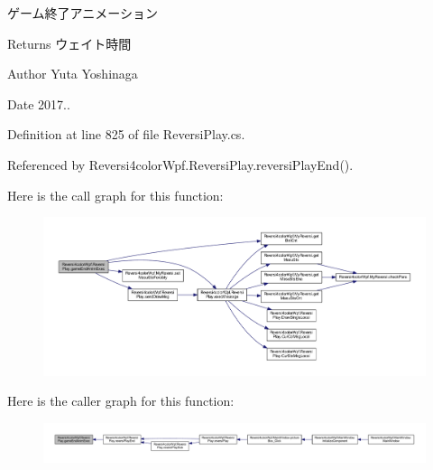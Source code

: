 ゲーム終了アニメーション 

\begin{DoxyReturn}{Returns}
ウェイト時間 
\end{DoxyReturn}
\begin{DoxyAuthor}{Author}
Yuta Yoshinaga 
\end{DoxyAuthor}
\begin{DoxyDate}{Date}
2017.. 
\end{DoxyDate}


Definition at line 825 of file Reversi\+Play.\+cs.



Referenced by Reversi4color\+Wpf.\+Reversi\+Play.\+reversi\+Play\+End().

Here is the call graph for this function\+:
\nopagebreak
\begin{figure}[H]
\begin{center}
\leavevmode
\includegraphics[width=350pt]{class_reversi4color_wpf_1_1_reversi_play_a11c4713ab8ff3fde4ebf7b0ab6cc7ed3_cgraph}
\end{center}
\end{figure}
Here is the caller graph for this function\+:
\nopagebreak
\begin{figure}[H]
\begin{center}
\leavevmode
\includegraphics[width=350pt]{class_reversi4color_wpf_1_1_reversi_play_a11c4713ab8ff3fde4ebf7b0ab6cc7ed3_icgraph}
\end{center}
\end{figure}
\mbox{\label{class_reversi4color_wpf_1_1_reversi_play_a5ad5b6251ce357ddfe1540c5559b9371}} 
